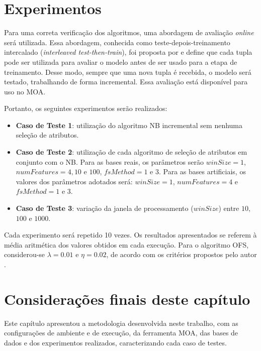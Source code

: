 \section{Experimentos}\label{sec:met_testes} 

Para uma correta verificação dos algoritmos, uma abordagem de avaliação \textit{online} será utilizada. Essa abordagem, conhecida como teste-depois-treinamento intercalado (\textit{interleaved test-then-train}), foi proposta por  e define que cada tupla pode ser utilizada para avaliar o modelo antes de ser usado para a etapa de treinamento. Desse modo, sempre que uma nova tupla é recebida, o modelo será testado, trabalhando de forma incremental. Essa avaliação está disponível para uso no MOA.

Portanto, os seguintes experimentos serão realizados:

\begin{itemize}
\item \textbf{Caso de Teste 1}: utilização do algoritmo NB incremental sem nenhuma seleção de atributos. 

\item \textbf{Caso de Teste 2}: utilização de cada algoritmo de seleção de atributos em conjunto com o NB. Para as bases reais, os parâmetros serão $winSize = 1$, $numFeatures = 4, 10$ e $100$, $fsMethod = 1$ e $3$. Para as bases artificiais, os valores dos parâmetros adotados será: $winSize = 1$, $numFeatures = 4$ e $fsMethod=1$ e $3$.

\item \textbf{Caso de Teste 3}: variação da janela de processamento ($winSize$) entre $10$, $100$ e $1000$.
\end{itemize}

Cada experimento será repetido 10 vezes. Os resultados apresentados se referem à média aritmética dos valores obtidos em cada execução. Para o algoritmo OFS, considerou-se $\lambda=0.01$ e $\eta= 0.02$, de acordo com os critérios propostos pelo autor \cite{Wang2014}.

\section{Considerações finais deste capítulo}

Este capítulo apresentou a metodologia desenvolvida neste trabalho, com as configurações de ambiente e de execução, da ferramenta MOA, das bases de dados e dos experimentos realizados, caracterizando cada caso de testes.

